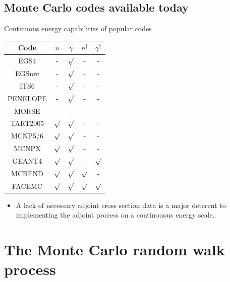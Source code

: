 \documentclass{beamer}
\begin{document}
\subsection{Monte Carlo codes available today}
\begin{frame}{Continuous energy capabilities of popular codes}
  
  \begin{table}[ht]
    \centering
    \begin{tabular}{c c c c c }
      \hline\hline
      Code & $n$ & $\gamma$ &  $n^{\dagger}$ & $\gamma^{\dagger}$ \\ [0.5ex]
      \hline
      EGS4 & - & $\surd$ & - & - \\
      EGSnrc & - & $\surd$ & - & - \\
      ITS6 & - & $\surd$ & - & - \\
      PENELOPE & - & $\surd$ & - & - \\
      MORSE & - & - & - & - \\
      TART2005 & $\surd$ & $\surd$ & - & - \\
      MCNP5/6 & $\surd$ & $\surd$ & - & - \\
      MCNPX & $\surd$ & $\surd$ & - & - \\
      GEANT4 & $\surd$ & $\surd$ & - & $\surd$ \\
      MCBEND & $\surd$ & $\surd$ & $\surd$ & - \\ [1ex]
      \hline
      FACEMC & $\surd$ & $\surd$ & $\surd$ & $\surd$ \\ [1ex]
      \hline
    \end{tabular}
  \end{table}

\begin{itemize}
  \item A lack of necessary adjoint cross section data is a major deterent to
    implementing the adjoint process on a continouous energy scale.
\end{itemize}
  
\end{frame}

\section{The Monte Carlo random walk process}
\end{document}
